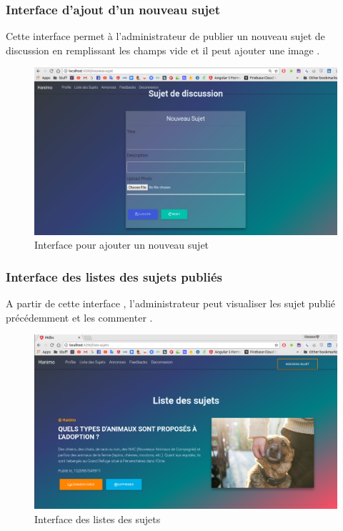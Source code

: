 \documentclass[11pt,a4paper,oneside]{book}
\begin{document}
					\subsubsection{Interface d'ajout d'un nouveau sujet}
					Cette interface permet à l’administrateur de publier un nouveau sujet de discussion en remplissant les champs vide et il peut ajouter une image .
					\begin{figure}[H]
						\centering
						\includegraphics[width=1\textwidth]{"newest maquettes/ajouter sujet"}
						\caption{Interface pour ajouter un nouveau sujet}
						\label{fig:ajouter-sujet}
					\end{figure}
					\subsubsection{Interface des listes des sujets publiés }
					A partir de cette interface , l’administrateur peut visualiser les sujet publié précédemment et les commenter .
					\begin{figure}[H]
						\centering
						\includegraphics[width=1\textwidth]{"newest maquettes/Screenshot from 2018-05-24 02-00-17"}
						\caption{Interface des listes des sujets}
						\label{fig:screenshot-from-2018-05-24-02-00-17}
					\end{figure}
\end{document}
